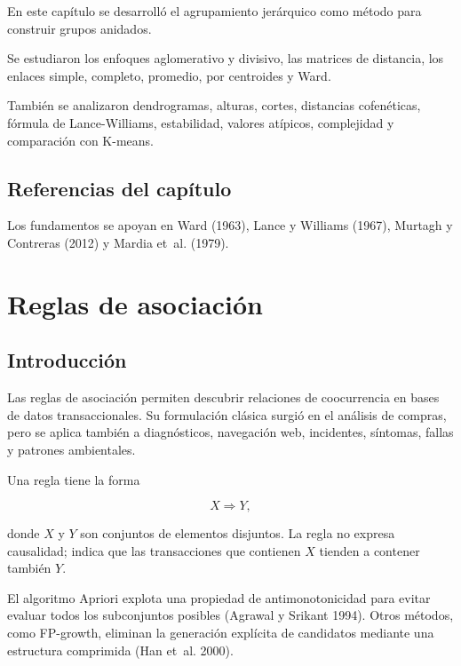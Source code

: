 \documentclass[
  spanish,
  10.5pt,
  letterpaper,
  DIV=11,
  numbers=noendperiod,
  oneside,
  open=any]{scrreprt}
\theoremstyle{definition}
\theoremstyle{definition}
\theoremstyle{plain}
\theoremstyle{remark}
\begin{document}

En este capítulo se desarrolló el agrupamiento jerárquico como método
para construir grupos anidados.

Se estudiaron los enfoques aglomerativo y divisivo, las matrices de
distancia, los enlaces simple, completo, promedio, por centroides y
Ward.

También se analizaron dendrogramas, alturas, cortes, distancias
cofenéticas, fórmula de Lance-Williams, estabilidad, valores atípicos,
complejidad y comparación con K-means.

\section*{Referencias del
capítulo}\label{referencias-del-capuxedtulo-18}


Los fundamentos se apoyan en Ward (1963), Lance y Williams (1967),
Murtagh y Contreras (2012) y Mardia et~al. (1979).

\chapter{\texorpdfstring{Reglas de
asociación}{Reglas de asociación}}\label{sec-reglas-asociacion}

\section*{Introducción}\label{introducciuxf3n-20}


Las reglas de asociación permiten descubrir relaciones de coocurrencia
en bases de datos transaccionales. Su formulación clásica surgió en el
análisis de compras, pero se aplica también a diagnósticos, navegación
web, incidentes, síntomas, fallas y patrones ambientales.

Una regla tiene la forma

\[
X\Rightarrow Y,
\]

donde \(X\) y \(Y\) son conjuntos de elementos disjuntos. La regla no
expresa causalidad; indica que las transacciones que contienen \(X\)
tienden a contener también \(Y\).

El algoritmo Apriori explota una propiedad de antimonotonicidad para
evitar evaluar todos los subconjuntos posibles (Agrawal y Srikant 1994).
Otros métodos, como FP-growth, eliminan la generación explícita de
candidatos mediante una estructura comprimida (Han et~al. 2000).
\end{document}
